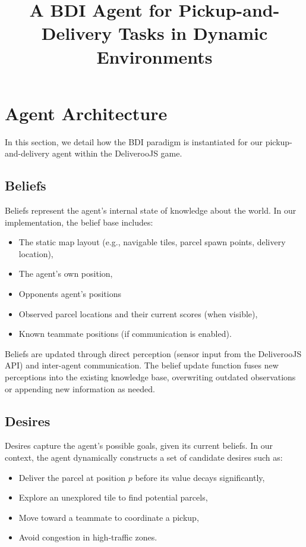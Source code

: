\documentclass[conference]{IEEEtran}
\title{A BDI Agent for Pickup-and-Delivery Tasks in Dynamic Environments}
\author{
	\IEEEauthorblockN{Mauro Antonio de Palma - 256175}
	\IEEEauthorblockA{Email: mauroantonio.depalma@studenti.unitn.it}
	\and
	\IEEEauthorblockN{Marco Crespi - 241177}
	\IEEEauthorblockA{Email: marco.crespi@studenti.unitn.it}
	
}
\begin{document}
\maketitle





\section{Agent Architecture}

In this section, we detail how the BDI paradigm is instantiated for our pickup-and-delivery agent within the DeliverooJS game.


\subsection{Beliefs}

Beliefs represent the agent’s internal state of knowledge about the world. In our implementation, the belief base includes:
\begin{itemize}
	\item The static map layout (e.g., navigable tiles, parcel spawn points, delivery location),
	\item The agent’s own position,
	\item Opponents agent's positions
	\item Observed parcel locations and their current scores (when visible),
	\item Known teammate positions (if communication is enabled).
\end{itemize}

Beliefs are updated through direct perception (sensor input from the DeliverooJS API) and inter-agent communication. The belief update function fuses new perceptions into the existing knowledge base, overwriting outdated observations or appending new information as needed.

\subsection{Desires}

Desires capture the agent’s possible goals, given its current beliefs. In our context, the agent dynamically constructs a set of candidate desires such as:
\begin{itemize}
	\item Deliver the parcel at position $p$ before its value decays significantly,
	\item Explore an unexplored tile to find potential parcels,
	\item Move toward a teammate to coordinate a pickup,
	\item Avoid congestion in high-traffic zones.
\end{itemize}
\end{document}
